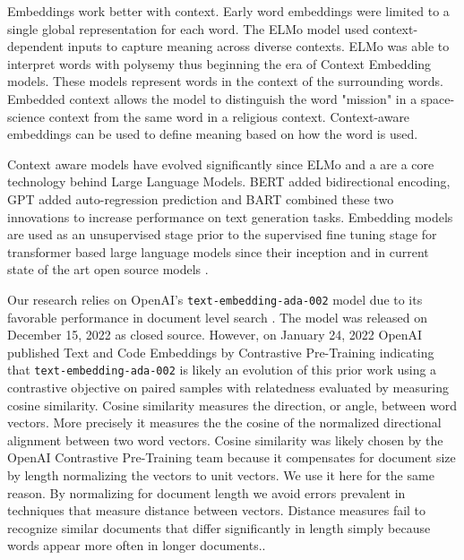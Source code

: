 \documentclass[preprint,12pt]{elsarticle}
\begin{document}
Embeddings work better with context. Early word embeddings were limited to a single global representation for each word. The ELMo model \cite{peters2018deepcontextualizedwordrepresentations} used context-dependent inputs to capture meaning across diverse contexts. ELMo was able to interpret words with polysemy thus beginning the era of Context Embedding models. These models represent words in the context of the surrounding words. Embedded context allows the model to distinguish the word "mission" in a space-science context from the same word in a religious context. Context-aware embeddings can be used to define meaning based on how the word is used. 

Context aware models have evolved significantly since ELMo and a are a core technology behind Large Language Models. BERT \cite{devlin2019bert_pretraining} added bidirectional encoding, GPT \cite{radford2018improving_GPT} added auto-regression prediction and BART \cite{lewis2019bart} combined these two innovations to increase performance on text generation tasks. Embedding models are used as an unsupervised stage prior to the supervised fine tuning stage for transformer based large language models since their inception \cite{vaswani2023attentionneed} and in current state of the art open source models \cite{grattafiori2024_llama3_herdmodels}.

Our research relies on OpenAI's \texttt{text-embedding-ada-002} model due to its favorable performance in document level search \cite{Aperdannier2024_embedding_search}. The model was released on December 15, 2022 \cite{openai2023ada_embeddings} as closed source. However, on January 24, 2022 OpenAI published Text and Code Embeddings by Contrastive Pre-Training \cite{neelakantan2022openAi_embeddings} indicating that \texttt{text-embedding-ada-002} is likely an evolution of this prior work using a contrastive objective on paired samples with relatedness evaluated by measuring cosine similarity.  Cosine similarity measures the direction, or angle, between word vectors.  More precisely it measures the the cosine of the normalized directional alignment between two word vectors. Cosine similarity was likely chosen by the OpenAI Contrastive Pre-Training team because it compensates for document size by length normalizing the vectors to unit vectors. We use it here for the same reason. By normalizing for document length we avoid errors prevalent in techniques that measure distance between vectors. Distance measures fail to recognize similar documents that differ significantly in length simply because words appear more often in longer documents.\cite{manning2008_introduction_ir}.
\end{document}
